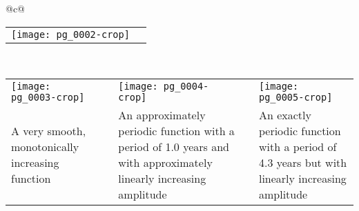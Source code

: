 

\newcommand{\uptext}[1]{\raisebox{2cm}{#1}}


\begin{tabular}{@{}c@{}}
\begin{tabular}{@{}cc@{}}


\texttt{[image: pg\_0002-crop]} 

 & \uptext{$=$} \\
\end{tabular}

\\
\begin{tabular}{p{7cm}p{0.1cm}p{7cm}p{0.1cm}p{7cm}}
\\%
\texttt{[image: pg\_0003-crop]} & 
 \uptext{$+$}  &  
\texttt{[image: pg\_0004-crop]} & 
\uptext{$+$} &  
\texttt{[image: pg\_0005-crop]} \\
{\scriptsize A very smooth, monotonically increasing function }
& & 
{\scriptsize An approximately periodic function with a period of 1.0 years and with
approximately linearly increasing amplitude}
& & 
{\scriptsize An exactly periodic function with a period of 4.3 years but with linearly
increasing amplitude }
\end{tabular}
\end{tabular}

